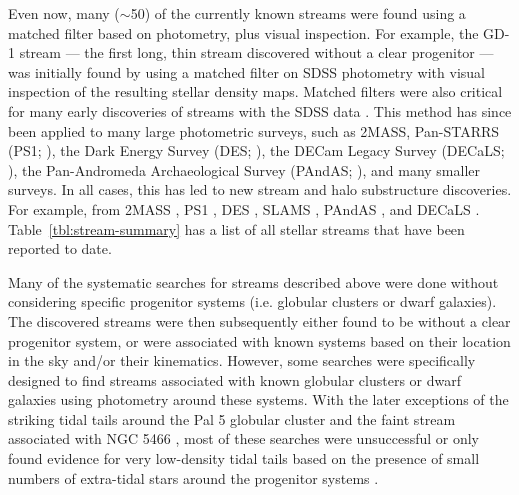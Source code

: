 \documentclass[final,5p,times,twocolumn,authoryear]{elsarticle}
\begin{document}
Even now, many ($\sim$50) of the currently known streams were found using a matched
filter based on photometry, plus visual inspection.
For example, the GD-1 stream --- the first long, thin stream discovered without a clear
progenitor --- was initially found by \citet{grillmair:2006-gd1} using a matched filter
on SDSS photometry with visual inspection of the resulting stellar density maps.
Matched filters were also critical for many early discoveries of streams with the SDSS
data \citep[e.g.,][]{newberg:2002, Yanny:2003, belokurov:2006, grillmair:2006-orphan}.
This method has since been applied to many large photometric surveys, such as 2MASS,
Pan-STARRS (PS1; \citealt{chambers:2016}), the Dark Energy Survey (DES;
\citealt{des:2005, des:2016}), the DECam Legacy Survey  (DECaLS; \citealt{dey:2019}),
the Pan-Andromeda Archaeological Survey (PAndAS; \citealt{mcconnachie:2009}),
and many smaller surveys.
In all cases, this has led to new stream and halo substructure discoveries.
For example, from 2MASS \citep{rocha-pinto:2003, rocha-pinto:2004}, PS1
\citep{bernard:2014, bernard:2016, navarrete:2017}, DES \citep{shipp:2018}, SLAMS
\citep{jethwa:2018}, PAndAS \citep{martin:2014}, and DECaLS \citep{shipp:2020}.
Table~\ref{tbl:stream-summary} has a list of all stellar streams that
have been reported to date.

Many of the systematic searches for streams described above were done without
considering specific progenitor systems (i.e. globular clusters or dwarf galaxies).
The discovered streams were then subsequently either found to be without a clear
progenitor system, or were associated with known systems based on their location in the
sky and/or their kinematics.
However, some searches were specifically designed to find streams associated with known
globular clusters or dwarf galaxies \citep[e.g.,][]{grillmair:1995, kuhn:1996,
leon:2000} using photometry around these systems.
With the later exceptions of the striking tidal tails around the Pal 5 globular cluster
\citep{odenkirchen:2001} and the faint stream associated with NGC 5466
\citep{grillmair:2006-ngc5466,belokurov:2006b}, most of these searches were unsuccessful or only found
evidence for very low-density tidal tails based on the presence of small numbers of
extra-tidal stars around the progenitor systems \citep{grillmair:1995, leon:2000}.
\end{document}
